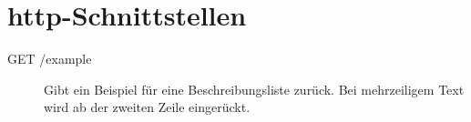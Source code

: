\section{\acs{http}-Schnittstellen} %

\begin{description}
    \item[GET /example] Gibt ein Beispiel für eine Beschreibungsliste zurück.
    Bei mehrzeiligem Text wird ab der zweiten Zeile eingerückt.
\end{description}
